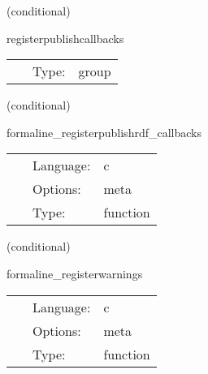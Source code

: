 \vspace{5mm}

\noindent {\bf }   (conditional) 

\hspace{5mm} registerpublishcallbacks 

\hspace{5mm}{\it tell cactus that this group exists, but is not scheduled from here } 


\hspace{5mm}

 \begin{tabular*}{160mm}{cll} 
~ & Type:  & group \\ 
\end{tabular*} 


\vspace{5mm}

   (conditional) 

\hspace{5mm} formaline\_registerpublishrdf\_callbacks 

\hspace{5mm}{\it register rdf callbacks for the publish api } 


\hspace{5mm}

 \begin{tabular*}{160mm}{cll} 
~ & Language:  & c \\ 
~ & Options:  & meta \\ 
~ & Type:  & function \\ 
\end{tabular*} 


\vspace{5mm}

   (conditional) 

\hspace{5mm} formaline\_registerwarnings 

\hspace{5mm}{\it register to receive warnings and info messages from the flesh } 


\hspace{5mm}

 \begin{tabular*}{160mm}{cll} 
~ & Language:  & c \\ 
~ & Options:  & meta \\ 
~ & Type:  & function \\ 
\end{tabular*} 


